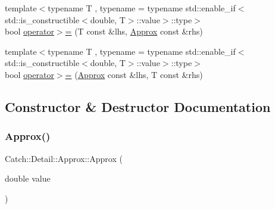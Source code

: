 \begin{DoxyCompactItemize}
\item 
{\footnotesize template$<$typename T , typename  = typename std\+::enable\+\_\+if$<$std\+::is\+\_\+constructible$<$double, T$>$\+::value$>$\+::type$>$ }\\bool \mbox{\hyperlink{class_catch_1_1_detail_1_1_approx_affd27efc62be386daeecb7a09e828d44}{operator$>$=}} (T const \&lhs, \mbox{\hyperlink{class_catch_1_1_detail_1_1_approx}{Approx}} const \&rhs)
\item 
{\footnotesize template$<$typename T , typename  = typename std\+::enable\+\_\+if$<$std\+::is\+\_\+constructible$<$double, T$>$\+::value$>$\+::type$>$ }\\bool \mbox{\hyperlink{class_catch_1_1_detail_1_1_approx_a5899b8a36725406701e2ebded2971ee6}{operator$>$=}} (\mbox{\hyperlink{class_catch_1_1_detail_1_1_approx}{Approx}} const \&lhs, T const \&rhs)
\end{DoxyCompactItemize}


\subsection{Constructor \& Destructor Documentation}
\mbox{\label{class_catch_1_1_detail_1_1_approx_a1a8618ea8db08c66bd3d9fe8f74b957a}} 
\subsubsection{\texorpdfstring{Approx()}{Approx()}\hspace{0.1cm}{\footnotesize\ttfamily [1/2]}}
{\footnotesize\ttfamily Catch\+::\+Detail\+::\+Approx\+::\+Approx (\begin{DoxyParamCaption}\item[{double}]{value }\end{DoxyParamCaption})\hspace{0.3cm}{\ttfamily [explicit]}}

\mbox{\label{class_catch_1_1_detail_1_1_approx_ab14b979fa8a37f21d037157fabed4072}} 
